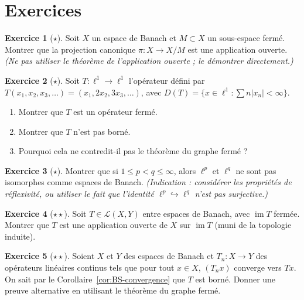 \documentclass[a4paper,12pt]{book}
\DeclareMathOperator{\im}{im}
\newcommand{\abs}[1]{\left| #1 \right|}
\theoremstyle{definition}
\newtheorem{exercice}{Exercice}[chapter]
\theoremstyle{plain}
\theoremstyle{remark}
\begin{document}
\section{Exercices}
\label{sec:exos-ch6}

\begin{exercice}[$\star$]
\label{exo:ouverte-quotient}
Soit $X$ un espace de Banach et $M \subset X$ un sous-espace fermé.
Montrer que la projection canonique $\pi : X \to X/M$ est une application ouverte.
\textit{(Ne pas utiliser le théorème de l'application ouverte ; le démontrer directement.)}
\end{exercice}

\begin{exercice}[$\star$]
\label{exo:graphe-ferme-simple}
Soit $T : \ell^1 \to \ell^1$ l'opérateur défini par
$T(x_1, x_2, x_3, \ldots) = (x_1, 2x_2, 3x_3, \ldots)$, avec
$D(T) = \{x \in \ell^1 : \sum n\abs{x_n} < \infty\}$.
\begin{enumerate}[label=(\alph*)]
  \item Montrer que $T$ est un opérateur fermé.
  \item Montrer que $T$ n'est pas borné.
  \item Pourquoi cela ne contredit-il pas le théorème du graphe fermé ?
\end{enumerate}
\end{exercice}

\begin{exercice}[$\star$]
\label{exo:isomorphisme-lp}
Montrer que si $1 \leq p < q \leq \infty$, alors $\ell^p$ et $\ell^q$
ne sont pas isomorphes comme espaces de Banach.
\textit{(Indication : considérer les propriétés de réflexivité, ou utiliser
le fait que l'identité $\ell^p \hookrightarrow \ell^q$ n'est pas surjective.)}
\end{exercice}

\begin{exercice}[$\star\star$]
\label{exo:app-ouverte-non-surjective}
Soit $T \in \mathcal{L}(X,Y)$ entre espaces de Banach, avec $\im T$ fermée.
Montrer que $T$ est une application ouverte de $X$ sur $\im T$ (muni de
la topologie induite).
\end{exercice}

\begin{exercice}[$\star\star$]
\label{exo:graphe-ferme-convergence}
Soient $X$ et $Y$ des espaces de Banach et $T_n : X \to Y$ des opérateurs
linéaires continus tels que pour tout $x \in X$, $(T_n x)$ converge vers
$Tx$. On sait par le Corollaire~\ref{cor:BS-convergence} que $T$ est borné.
Donner une preuve alternative en utilisant le théorème du graphe fermé.
\end{exercice}
\end{document}
